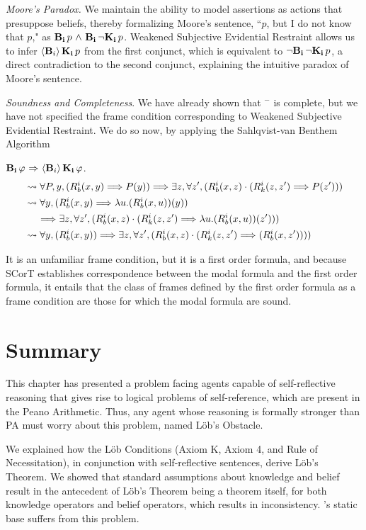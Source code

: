\emph{Moore's Paradox. } We maintain the ability to model assertions as actions that presuppose beliefs, thereby formalizing Moore's sentence, ``$p$, but I do not know that $p$," as $\mathbf{B}_{\mathbf{i}}\,p {\ \wedge \ } \mathbf{B}_{\mathbf{i}}\,{\neg}\mathbf{K}_{\mathbf{i}}\,p$. Weakened Subjective Evidential Restraint allows us to infer $\langle \mathbf{B}_{i} \rangle\,\mathbf{K}_{\mathbf{i}}\,p$ from the first conjunct, which is equivalent to ${\neg} \mathbf{B}_{\mathbf{i}}\,{\neg}\mathbf{K}_{\mathbf{i}}\,p$, a direct contradiction to the second conjunct, explaining the intuitive paradox of Moore's sentence.

\emph{Soundness and Completeness}. We have already shown that \DASL$^-$ is complete, but we have not specified the frame condition corresponding to Weakened Subjective Evidential Restraint. We do so now, by applying the Sahlqvist-van Benthem Algorithm

	$\mathbf{B}_{\mathbf{i}}\,\varphi {\ \Rightarrow \ } \langle \mathbf{B}_{i} \rangle\,\mathbf{K}_{\mathbf{i}}\,\varphi$.
\begin{align*}
&\rightsquigarrow \forall P,y, (R_{b}^i(x,y)\Longrightarrow P(y)) \Longrightarrow \exists z, \forall z',(R_{b}^i(x,z)\cdot (R_{k}^i(z,z') \Longrightarrow P(z')))\\
&\rightsquigarrow \forall y, (R_{b}^i(x,y)\Longrightarrow \lambda u.(R_{b}^i(x,u))(y)) \\ &\ \ \ \ \Longrightarrow \exists z,\forall z', (R_{b}^i(x,z)\cdot (R_{k}^i(z,z') \Longrightarrow \lambda u.(R_{b}^i(x,u))(z')))\\
&\rightsquigarrow \forall y, (R_{b}^i(x,y)) \Longrightarrow \exists z,\forall z', (R_{b}^i(x,z)\cdot (R_{k}^i(z,z') \Longrightarrow  (R_{b}^i(x,z'))))		
\end{align*}

It is an unfamiliar frame condition, but it is a first order formula, and because SCorT establishes correspondence between the modal formula and the first order formula, it entails that the class of frames defined by the first order formula as a frame condition are those for which the modal formula are sound.

\section{Summary}
This chapter has presented a problem facing agents capable of self-reflective reasoning that gives rise to logical problems of self-reference, which are present in the Peano Arithmetic. Thus, any agent whose reasoning is formally stronger than PA must worry about this problem, named L\"ob's Obstacle.

We explained how the L\"ob Conditions (Axiom K, Axiom 4, and Rule of Necessitation), in conjunction with self-reflective sentences, derive L\"ob's Theorem. We showed that standard assumptions about knowledge and belief result in the antecedent of L\"ob's Theorem being a theorem itself, for both knowledge operators and belief operators, which results in inconsistency. \DASL's static base suffers from this problem.


